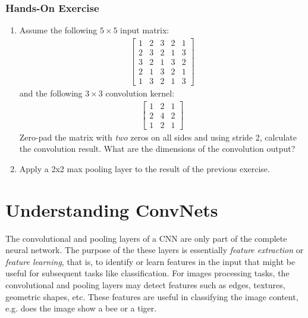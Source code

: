 \begin{tcolorbox}[colback=code]
\subsubsection*{Hands-On Exercise} 
\begin{enumerate}
\item Assume the following $5 \times 5$ input matrix:
\begin{align*}
\begin{bmatrix} 1 & 2 & 3 & 2 & 1 \\ 
                2 & 3 & 2 & 1 & 3 \\ 
                3 & 2 & 1 & 3 & 2 \\
                2 & 1 & 3 & 2 & 1 \\               
                1 & 3 & 2 & 1 & 3 
\end{bmatrix}
\end{align*}
and the following $3 \times 3$ convolution kernel:
\begin{align*}
\begin{bmatrix}  1 & 2 & 1 \\ 
                2 & 4 & 2 \\
                1 & 2 & 1 \end{bmatrix}
\end{align*}
Zero-pad the matrix with \emph{two} zeros on all sides and using stride 2, calculate the convolution result. What are the dimensions of the convolution output?

\item Apply a 2x2 max pooling layer to the result of the previous exercise. 
\end{enumerate}
\end{tcolorbox}

\section{Understanding ConvNets}

The convolutional and pooling layers of a CNN are only part of the complete neural network. The purpose of the these layers is essentially \emph{feature extraction} or \emph{feature learning}, that is, to identify or learn features in the input that might be useful for subsequent tasks like classification. For images processing tasks, the convolutional and pooling layers may detect features such as edges, textures, geometric shapes, etc. These features are useful in classifying the image content, e.g. does the image show a bee or a tiger. 

